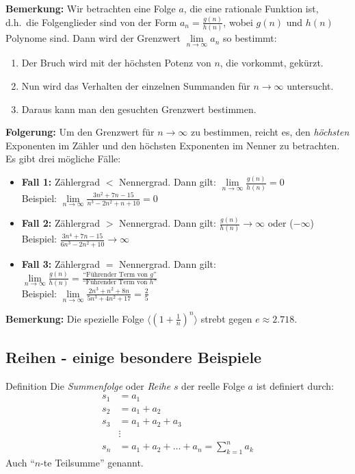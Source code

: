 \textbf{Bemerkung:} Wir betrachten eine Folge $a$, die eine rationale Funktion ist, d.h.\ die Folgenglieder sind von der Form $a_n = \frac{g(n)}{h(n)}$, wobei $g(n)$ und $h(n)$ Polynome sind.
Dann wird der Grenzwert $\lim \limits_{n \rightarrow \infty} a_n$ so bestimmt:
\begin{enumerate}
    \item Der Bruch wird mit der höchsten Potenz von $n$, die vorkommt, gekürzt.
    \item Nun wird das Verhalten der einzelnen Summanden für $n \rightarrow \infty$ untersucht.
    \item Daraus kann man den gesuchten Grenzwert bestimmen.
\end{enumerate}
\textbf{Folgerung:} Um den Grenzwert für $n \rightarrow \infty$ zu bestimmen, reicht es, den \emph{höchsten} Exponenten im Zähler und den höchsten Exponenten im Nenner zu betrachten.
Es gibt drei mögliche Fälle:
\begin{itemize}
    \item[] \textbf{Fall 1:} Zählergrad $<$ Nennergrad.
    Dann gilt: $\lim \limits_{n \rightarrow \infty} \frac{g(n)}{h(n)} = 0$\\
    Beispiel: $\lim \limits_{n \rightarrow \infty} \frac{3n^2 + 7n - 15}{n^3 - 2n^2 + n + 10} = 0$
    \item[] \textbf{Fall 2:} Zählergrad $>$ Nennergrad.
    Dann gilt: $\frac{g(n)}{h(n)} \rightarrow \infty$ oder ($-\infty$)\\
    Beispiel: $\frac{3n^4 + 7n - 15}{6n^3 - 2n^2 + 10} \rightarrow \infty$
    \item[] \textbf{Fall 3:} Zählergrad $=$ Nennergrad.
    Dann gilt: $\lim \limits_{n \rightarrow \infty} \frac{g(n)}{h(n)} = \frac{\text{``Führender Term von $g$''}}{\text{``Führender Term von $h$''}}$\\
    Beispiel: $\lim \limits_{n \rightarrow \infty} \frac{2n^3 + n^2 + 8n}{5n^3 + 4n^2 + 17} = \frac{2}{5}$
\end{itemize}

\textbf{Bemerkung:} Die spezielle Folge $\langle \left(1 + \frac{1}{n}\right)^n \rangle$ strebt gegen $e \approx 2.718$.

\subsection{Reihen - einige besondere Beispiele}\label{subsec:reihen-beispiele}

\begin{definition}{Definition}
    Die \emph{Summenfolge} oder \emph{Reihe} $s$ der reelle Folge $a$ ist definiert durch:
    \begin{align*}
        s_1 &= a_1 \\
        s_2 &= a_1 + a_2 \\
        s_3 &= a_1 + a_2 + a_3 \\
        &\vdots \\
        s_n &= a_1 + a_2 + \dots + a_n = \sum \limits_{k=1}^n a_k
    \end{align*}
    Auch ``$n$-te Teilsumme'' genannt.
\end{definition}

